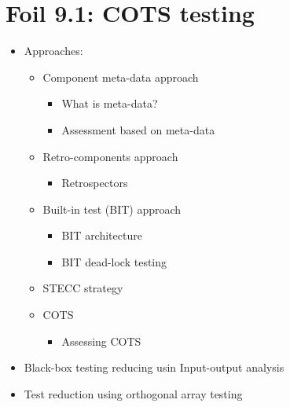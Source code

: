 	\section{Foil 9.1: COTS testing}
		\begin{itemize}
			\item Approaches:
				\begin{itemize}
					\item Component meta-data approach
						\begin{itemize}
							\item What is meta-data?
							\item Assessment based on meta-data
						\end{itemize}
					\item Retro-components approach
						\begin{itemize}
							\item Retrospectors
						\end{itemize}
					\item Built-in test (BIT) approach
						\begin{itemize}
							\item BIT architecture
							\item BIT dead-lock testing
						\end{itemize}
					\item STECC strategy
					\item COTS
						\begin{itemize}
							\item Assessing COTS
						\end{itemize}
				\end{itemize}
			\item Black-box testing reducing usin Input-output analysis
			\item Test reduction using orthogonal array testing
		\end{itemize}

